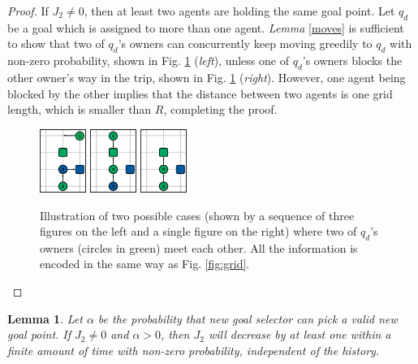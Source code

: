 \documentclass[journal]{IEEEtran}
\newtheorem{lemma}{Lemma}[subsection]
\begin{document}
\begin{proof}\vskip -20pt
If $J_2\neq 0$, then at least two agents are holding the same goal point. Let $q_d$ be a goal which is assigned to more than one agent. \textit{Lemma} \ref{moves} is sufficient to show that two of $q_d$'s owners can concurrently keep moving greedily to $q_d$ with non-zero probability, shown in Fig. \ref{fig:meet} (\textit{left}), unless one of $q_d$'s owners blocks the other owner's way in the trip, shown in Fig. \ref{fig:meet} (\textit{right}). However, one agent being blocked by the other implies that the distance between two agents is one grid length, which is smaller than $R$, completing the proof.

\begin{figure}[h]
 \centering
 {\includegraphics[width=0.135\textwidth]{meet/00.jpg}}
{\includegraphics[width=0.135\textwidth]{meet/01.jpg}}\hfill\hfill\hfill\hfill
{\includegraphics[width=0.135\textwidth]{meet/02.jpg}}
\caption{Illustration of two possible cases (shown by a sequence of three figures on the left and a single figure on the right) where two of $q_d$'s owners (circles in green) meet each other. All the information is encoded in the same way as Fig. \ref{fig:grid}.}
\label{fig:meet}
\end{figure}
\end{proof}

\begin{lemma} 
Let $\alpha$ be the probability that \textit{new goal selector} can pick a valid new goal point. If $J_2 \neq 0$ and $\alpha > 0$, then $J_2$ will decrease by at least one within a finite amount of time with non-zero probability, independent of the history.
\label{lemma4}
\end{lemma}
\end{document}
